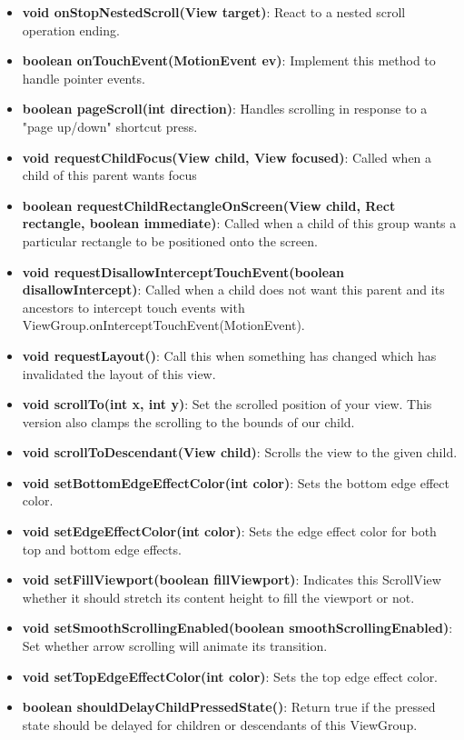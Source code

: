 \documentclass{report}
\begin{document}
\begin{itemize}
\begin{itemize}
\begin{itemize}
                \item \textbf{void	onStopNestedScroll(View target)}: React to a nested scroll operation ending.
                \item \textbf{boolean	onTouchEvent(MotionEvent ev)}: Implement this method to handle pointer events.
                \item \textbf{boolean	pageScroll(int direction)}: Handles scrolling in response to a "page up/down" shortcut press.
                \item \textbf{void	requestChildFocus(View child, View focused)}: Called when a child of this parent wants focus
                \item \textbf{boolean	requestChildRectangleOnScreen(View child, Rect rectangle, boolean immediate)}: Called when a child of this group wants a particular rectangle to be positioned onto the screen.
                \item \textbf{void	requestDisallowInterceptTouchEvent(boolean disallowIntercept)}: Called when a child does not want this parent and its ancestors to intercept touch events with ViewGroup.onInterceptTouchEvent(MotionEvent).
                \item \textbf{void	requestLayout()}: Call this when something has changed which has invalidated the layout of this view.
                \item \textbf{void	scrollTo(int x, int y)}: Set the scrolled position of your view. This version also clamps the scrolling to the bounds of our child.
                \item \textbf{void	scrollToDescendant(View child)}: Scrolls the view to the given child.
                \item \textbf{void	setBottomEdgeEffectColor(int color)}: Sets the bottom edge effect color.
                \item \textbf{void	setEdgeEffectColor(int color)}: Sets the edge effect color for both top and bottom edge effects.
                \item \textbf{void	setFillViewport(boolean fillViewport)}: Indicates this ScrollView whether it should stretch its content height to fill the viewport or not.
                \item \textbf{void	setSmoothScrollingEnabled(boolean smoothScrollingEnabled)}: Set whether arrow scrolling will animate its transition.
                \item \textbf{void	setTopEdgeEffectColor(int color)}: Sets the top edge effect color.
                \item \textbf{boolean	shouldDelayChildPressedState()}: Return true if the pressed state should be delayed for children or descendants of this ViewGroup.

\end{itemize}
\end{itemize}
\end{itemize}
\end{document}
